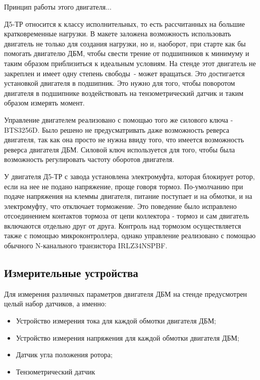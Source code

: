 Принцип работы этого двигателя...

Д5-ТР относится к классу исполнительных, то есть рассчитанных на большие 
кратковременные нагрузки. В макете заложена возможность использовать двигатель не только для
создания нагрузки, но и, наоборот, при старте как бы помогать двигателю ДБМ, чтобы
свести трение от подшипников к минимуму и таким образом приблизиться к идеальным условиям.
На стенде этот двигатель не закреплен и имеет одну степень свободы~- может вращаться. Это
достигается установкой двигателя в подшипник. Это нужно для того, чтобы поворотом двигателя в 
подшипнике воздействовать на тензометрический датчик и таким образом измерять момент.

\clearpage

Управление двигателем реализовано с помощью того же силового ключа - BTS3256D.
Было решено не предусматривать даже возможность реверса двигателя, так как она просто не нужна
ввиду того, что имеется возможность реверса двигателя ДБМ. Силовой ключ используется для того, чтобы
была возможность регулировать частоту оборотов двигателя. 

У двигателя Д5-ТР с завода установлена
электромуфта, которая блокирует ротор, если на нее не подано напряжение, проще говоря тормоз. По-умолчанию при подаче
напряжения на клеммы двигателя, питание поступает и на обмотки, и на электромуфту, что отключает торможение. Это поведение
было исправлено отсоединением контактов тормоза от цепи коллектора - тормоз и сам двигатель
включаются отдельно друг от друга. Контроль над тормозом осуществляется также с помощью микроконтроллера,
однако управление реализовано с помощью обычного N-канального транзистора IRLZ34NSPBF.

\subsection{Измерительные устройства}

Для измерения различных параметров двигателя ДБМ на стенде предусмотрен целый набор датчиков,
а именно:

\begin{itemize}
  \item Устройство измерения тока для каждой обмотки двигателя ДБМ;
  \item Устройство измерения напряжения для каждой обмотки двигателя ДБМ;
  \item Датчик угла положения ротора;
  \item Тензометрический датчик
\end{itemize}

